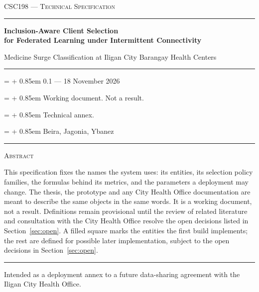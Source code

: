 \documentclass[11pt,a4paper]{article}
\newcommand{\metarow}[2]{%
  \par\noindent\hangindent=\dimexpr 2.35cm + 0.85em\relax\hangafter=1
  \makebox[2.35cm][r]{\color{muted}\scshape #1}\hspace{0.85em}#2\par}
\begin{document}
\hypersetup{pageanchor=false}
\begin{titlepage}
\thispagestyle{empty}
\begin{flushleft}
  {\color{muted}\scshape\normalsize CSC198 --- Technical Specification}\par
  \vspace{0.5em}
  {\color{accent}\rule{\textwidth}{1.2pt}}\par
  \vspace{1.7em}
  {\fontsize{17}{21}\selectfont\bfseries\color{ink}%
    Inclusion-Aware Client Selection\\[0.12em]
    for Federated Learning under Intermittent Connectivity\par}
  \vspace{1.0em}
  {\fontsize{13.5}{18}\selectfont\color{slate}%
    Medicine Surge Classification at Iligan City Barangay Health Centers\par}
  \vspace{1.6em}
  {\color{rule}\rule{\textwidth}{0.4pt}}\par
  \vspace{1.6em}
  {\small
  \metarow{version}{0.1 --- 18 November 2026}
  \metarow{status}{Working document. Not a result.}
  \metarow{role}{Technical annex.}
  \metarow{group}{Beira, Jagonia, Ybanez}
  }
\end{flushleft}

\vspace{1.5em}
{\color{rule}\rule{\textwidth}{0.4pt}}\par
\vspace{1.3em}
{\scshape\color{muted}\footnotesize Abstract}\par
\vspace{0.35em}
\begin{minipage}{\dimexpr\textwidth-1.4cm\relax}
{\linespread{1.06}\selectfont\small
This specification fixes the names the system uses: its entities, its selection
policy families, the formulas behind its metrics, and the parameters a deployment
may change. The thesis, the prototype and any City Health Office documentation are meant to
describe the same objects in the same words. It is a working document, not a
result. Definitions remain provisional until the review of related literature and
consultation with the City Health Office resolve the open decisions listed in
Section~\ref{sec:open}. A filled square marks the entities the first build implements;
the rest are defined for possible later implementation, subject to the open decisions in
Section~\ref{sec:open}.\par}
\end{minipage}

\vfill

{\color{rule}\rule{\textwidth}{0.4pt}}\par
\vspace{0.55em}
{\footnotesize\color{muted}Intended as a deployment annex to a future data-sharing agreement with
the Iligan City Health Office.}
\end{titlepage}
\hypersetup{pageanchor=true}
\end{document}
